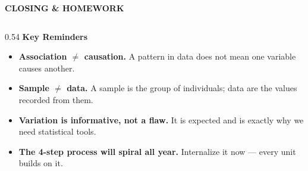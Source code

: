 \documentclass[aspectratio=169, 11pt]{beamer}
\begin{document}
{
\begin{frame}[t, plain]
  \vspace{0.45cm}\par
  \hspace{0.55cm}%
  \begin{minipage}{0.9\textwidth}
    {\color{goldacc}\bfseries\footnotesize\MakeUppercase{Closing \& Homework}}
    \vspace{0.45cm}\par
    \begin{columns}[T]

      \begin{column}{0.54\textwidth}
        \small
        {\color{goldacc}\bfseries Key Reminders}\\[5pt]
        \begin{itemize}
          \setlength{\itemsep}{0.4em}\setlength{\topsep}{0em}
          \item {\color{white}\textbf{Association $\neq$ causation.}
            {\color{skymid} A pattern in data does not mean one variable
            causes another.}}
          \item {\color{white}\textbf{Sample $\neq$ data.}
            {\color{skymid} A sample is the group of individuals; data are
            the values recorded from them.}}
          \item {\color{white}\textbf{Variation is informative, not a flaw.}
            {\color{skymid} It is expected and is exactly why we need
            statistical tools.}}
          \item {\color{white}\textbf{The 4-step process will spiral all year.}
            {\color{skymid} Internalize it now --- every unit builds on it.}}
        \end{itemize}
      \end{column}


\end{columns}
\end{minipage}
\end{frame}}
\end{document}
